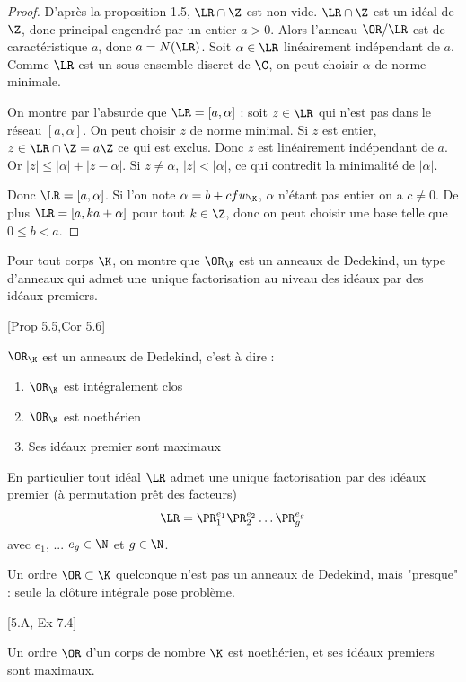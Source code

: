 \begin{proof}
	D'après la proposition 1.5, $\LR\cap\Z$ est non vide. $\LR\cap\Z$ est un idéal de $\Z$, donc principal engendré par un entier $a > 0$. Alors l'anneau $\OR/\LR$ est de caractéristique $a$, donc $a = N(\LR)$. Soit $\alpha\in\LR$ linéairement indépendant de $a$. Comme $\LR$ est un sous ensemble discret de $\C$, on peut choisir $\alpha$ de norme minimale. 
	
	On montre par l'absurde que $\LR = \left[ a,\alpha\right]$ : soit $z\in\LR$ qui n'est pas dans le réseau $\left[ a,\alpha\right]$. On peut choisir $z$ de norme minimal. Si $z$ est entier, $z\in \LR\cap\Z = a\Z$ ce qui est exclus. Donc $z$ est linéairement indépendant de $a$. Or $|z| \leq |\alpha| + |z - \alpha|$. Si $z\neq\alpha$, $|z| < |\alpha|$, ce qui contredit la minimalité de $|\alpha|$. 
	
	Donc $\LR = \left[ a, \alpha\right]$. Si l'on note $\alpha = b + cfw_{\K}$, $\alpha$ n'étant pas entier on a $c \neq 0$. De plus $\LR = \left[ a, ka + \alpha\right]$ pour tout $k\in\Z$, donc on peut choisir une base telle que $0 \leq b< a$. 
\end{proof}

Pour tout corps $\K$, on montre que $\OR_{\K}$ est un anneaux de Dedekind, un type d'anneaux qui admet une unique factorisation au niveau des idéaux par des idéaux premiers.

\begin{The}\cite{Cox}[Prop 5.5,Cor 5.6]
	
	$\OR_{\K}$ est un anneaux de Dedekind, c'est à dire :
	\begin{enumerate}
		\item $\OR_{\K}$ est intégralement clos
		\item $\OR_{\K}$ est noethérien
		\item Ses idéaux premier sont maximaux 
	\end{enumerate}
	En particulier tout idéal $\LR$ admet une unique factorisation par des idéaux premier (à permutation prêt des facteurs)
	\begin{equation*}
		\LR = \PR_{1}^{e_{1}}\PR_{2}^{e_{2}}\ldots\PR_{g}^{e_{g}}
	\end{equation*}
	avec $e_{1}$, ... $e_{g}\in\N$ et $g\in\N$.
\end{The}

Un ordre $\OR\subset\K$ quelconque n'est pas un anneaux de Dedekind, mais "presque" : seule la clôture intégrale pose problème.

\begin{Prop}\cite{Cox}[5.A, Ex 7.4]
	
	Un ordre $\OR$ d'un corps de nombre $\K$ est noethérien, et ses idéaux premiers sont maximaux.
\end{Prop}

